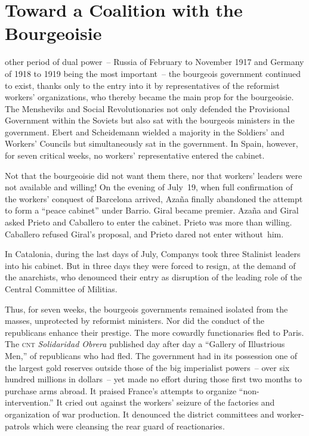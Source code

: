 \chapter{Toward a Coalition with the Bourgeoisie}

 other period of dual power~-- Russia of February to November 1917 and Germany of 1918 to 1919 being the most important~-- the bourgeois government continued to exist, thanks only to the entry into it by representatives of the reformist workers’ organizations, who thereby became the main prop for the bourgeoisie. The Mensheviks and Social Revolutionaries not only defended the Provisional Government within the Soviets but also sat with the bourgeois ministers in the government. Ebert and Scheidemann wielded a majority in the Soldiers’ and Workers’ Councils but simultaneously sat in the government. In Spain, however, for seven critical weeks, no workers’ representative entered the cabinet.

Not that the bourgeoisie did not want them there, nor that workers’ leaders were not available and willing! On the evening of July~19, when full confirmation of the workers’ conquest of Barcelona arrived, Azaña finally abandoned the attempt to form a ``peace cabinet'' under Barrio. Giral became premier. Azaña and Giral asked Prieto and Caballero to enter the cabinet. Prieto was more than willing. Caballero refused Giral’s proposal, and Prieto dared not enter without~him.
\nowidow

In Catalonia, during the last days of July, Companys took three Stalinist leaders into his cabinet. But in three days they were forced to resign, at the demand of the anarchists, who denounced their entry as disruption of the leading role of the Central Committee of Militias.

Thus, for seven weeks, the bourgeois governments remained isolated from the masses, unprotected by reformist ministers. Nor did the conduct of the republicans enhance their prestige. The more cowardly functionaries fled to Paris. The \textsc{cnt} \emph{Solidaridad Obrera} published day after day a ``Gallery of Illustrious Men,'' of republicans who had fled. The government had in its possession one of the largest gold reserves outside those of the big imperialist powers~-- over six hundred millions in dollars~-- yet made no effort during those first two months to purchase arms abroad. It praised France’s attempts to organize ``non-intervention.'' It cried out against the workers’ seizure of the factories and organization of war production. It denounced the district committees and worker-patrols which were cleansing the rear guard of reactionaries.

